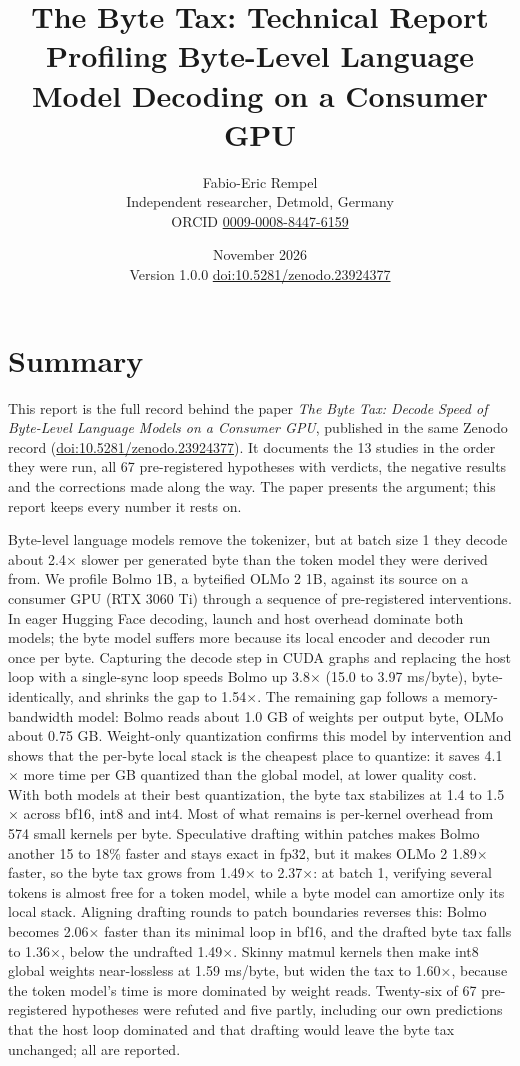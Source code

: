 \documentclass[11pt,a4paper]{article}
\title{The Byte Tax: Technical Report\\[4pt]\large Profiling Byte-Level Language Model Decoding on a Consumer GPU}
\author{Fabio-Eric Rempel\\[2pt]
  \small Independent researcher, Detmold, Germany\\
  \small ORCID \href{https://orcid.org/0009-0008-8447-6159}{0009-0008-8447-6159}}
\date{November 2026\\[2pt]\small Version 1.0.0 \quad \href{https://doi.org/10.5281/zenodo.23924377}{doi:10.5281/zenodo.23924377}}
\newcommand{\x}{\ensuremath{\times}}
\begin{document}
\maketitle
\tableofcontents
\bigskip
\section*{Summary}

This report is the full record behind the paper \emph{The Byte Tax: Decode Speed of Byte-Level Language Models on a Consumer GPU}, published in the same Zenodo record (\href{https://doi.org/10.5281/zenodo.23924377}{doi:10.5281/zenodo.23924377}). It documents the 13 studies in the order they were run, all 67 pre-registered hypotheses with verdicts, the negative results and the corrections made along the way. The paper presents the argument; this report keeps every number it rests on.

Byte-level language models remove the tokenizer, but at batch size 1 they decode about 2.4\x{} slower per generated byte than the token model they were derived from. We profile Bolmo 1B, a byteified OLMo 2 1B, against its source on a consumer GPU (RTX 3060 Ti) through a sequence of pre-registered interventions. In eager Hugging Face decoding, launch and host overhead dominate both models; the byte model suffers more because its local encoder and decoder run once per byte. Capturing the decode step in CUDA graphs and replacing the host loop with a single-sync loop speeds Bolmo up 3.8\x{} (15.0 to 3.97 ms/byte), byte-identically, and shrinks the gap to 1.54\x{}. The remaining gap follows a memory-bandwidth model: Bolmo reads about 1.0 GB of weights per output byte, OLMo about 0.75 GB. Weight-only quantization confirms this model by intervention and shows that the per-byte local stack is the cheapest place to quantize: it saves 4.1\x{} more time per GB quantized than the global model, at lower quality cost. With both models at their best quantization, the byte tax stabilizes at 1.4 to 1.5\x{} across bf16, int8 and int4. Most of what remains is per-kernel overhead from 574 small kernels per byte. Speculative drafting within patches makes Bolmo another 15 to 18\% faster and stays exact in fp32, but it makes OLMo 2 1.89\x{} faster, so the byte tax grows from 1.49\x{} to 2.37\x{}: at batch 1, verifying several tokens is almost free for a token model, while a byte model can amortize only its local stack. Aligning drafting rounds to patch boundaries reverses this: Bolmo becomes 2.06\x{} faster than its minimal loop in bf16, and the drafted byte tax falls to 1.36\x{}, below the undrafted 1.49\x{}. Skinny matmul kernels then make int8 global weights near-lossless at 1.59 ms/byte, but widen the tax to 1.60\x{}, because the token model's time is more dominated by weight reads. Twenty-six of 67 pre-registered hypotheses were refuted and five partly, including our own predictions that the host loop dominated and that drafting would leave the byte tax unchanged; all are reported.
\end{document}
